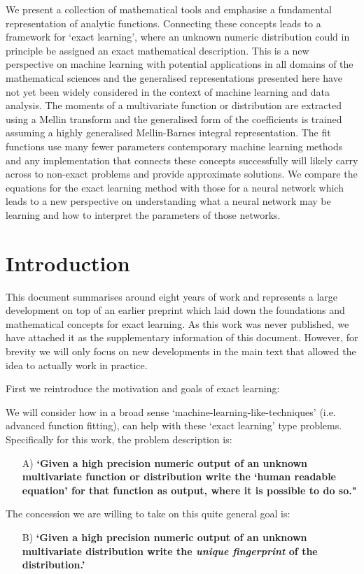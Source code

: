\documentclass{article}
\begin{document}
We present a collection of mathematical tools and emphasise a fundamental representation of analytic functions. Connecting these concepts leads to a framework for `exact learning', where an unknown numeric distribution could in principle be assigned an exact mathematical description. This is a new perspective on machine learning with potential applications in all domains of the mathematical sciences and the generalised representations presented here have not yet been widely considered in the context of machine learning and data analysis. The moments of a multivariate function or distribution are extracted using a Mellin transform and the generalised form of the coefficients is trained assuming a highly generalised Mellin-Barnes integral representation. The fit functions use many fewer parameters contemporary machine learning methods and any implementation that connects these concepts successfully will likely carry across to non-exact problems and provide approximate solutions. We compare the equations for the exact learning method with those for a neural network which leads to a new perspective on understanding what a neural network may be learning and how to interpret the parameters of those networks.


\section{Introduction}
This document summarises around eight years of work and represents a large development on top of an earlier preprint which laid down the foundations and mathematical concepts for exact learning. As this work was never published, we have attached it as the supplementary information of this document. However, for brevity we will only focus on new developments in the main text that allowed the idea to actually work in practice. 







First we reintroduce the motivation and goals of exact learning:


We will consider how in a broad sense `machine-learning-like-techniques' (i.e. advanced function fitting), can help with these `exact learning' type problems. Specifically for this work, the problem description is: 
\begin{enumerate}
\item[A)] \textbf{`Given a high precision numeric output of an unknown multivariate function or distribution write the `human readable equation' for that function as output, where it is possible to do so."}
\end{enumerate}
The concession we are willing to take on this quite general goal is:
\begin{enumerate}
\item[B)] \textbf{`Given a high precision numeric output of an unknown multivariate distribution write the \emph{unique fingerprint} of the distribution.'}
\end{enumerate}
\end{document}
